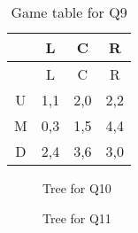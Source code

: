 \documentclass[
  12pt,
  letterpaper,
  DIV=11,
  numbers=noendperiod]{scrartcl}
\begin{document}
\begin{longtable}[]{@{}cccc@{}}
\caption{Game table for Q9}\label{tbl-dom}\tabularnewline
\toprule\noalign{}
& L & C & R \\
\midrule\noalign{}
\endfirsthead
\toprule\noalign{}
& L & C & R \\
\midrule\noalign{}
\endhead
\bottomrule\noalign{}
\endlastfoot
U & 1,1 & 2,0 & 2,2 \\
M & 0,3 & 1,5 & 4,4 \\
D & 2,4 & 3,6 & 3,0 \\
\end{longtable}

\begin{figure}


\caption{\label{fig-back}Tree for Q10}

\end{figure}%

\begin{figure}


\caption{\label{fig-signal}Tree for Q11}

\end{figure}%
\end{document}
